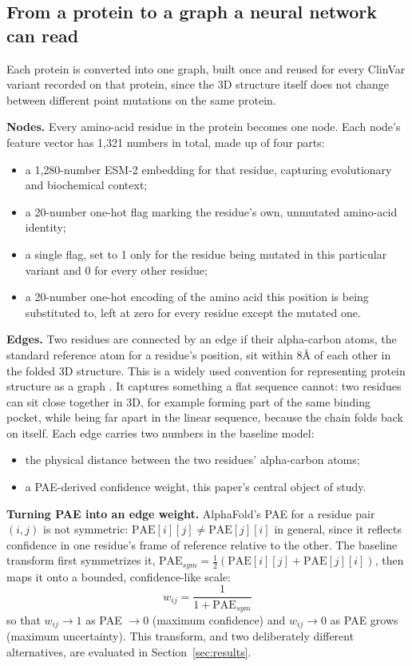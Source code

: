 \documentclass[10pt,conference,a4paper]{IEEEtran}
\begin{document}
\subsection{From a protein to a graph a neural network can read}

Each protein is converted into one graph, built once and reused for every ClinVar variant recorded on that protein, since the 3D structure itself does not change between different point mutations on the same protein.

\textbf{Nodes.} Every amino-acid residue in the protein becomes one node. Each node's feature vector has 1{,}321 numbers in total, made up of four parts:
\begin{itemize}
\item a 1{,}280-number ESM-2 embedding for that residue, capturing evolutionary and biochemical context;
\item a 20-number one-hot flag marking the residue's own, unmutated amino-acid identity;
\item a single flag, set to 1 only for the residue being mutated in this particular variant and 0 for every other residue;
\item a 20-number one-hot encoding of the amino acid this position is being substituted to, left at zero for every residue except the mutated one.
\end{itemize}

\textbf{Edges.} Two residues are connected by an edge if their alpha-carbon atoms, the standard reference atom for a residue's position, sit within 8\r{A} of each other in the folded 3D structure. This is a widely used convention for representing protein structure as a graph \cite{gligorijevic2021deepfri}. It captures something a flat sequence cannot: two residues can sit close together in 3D, for example forming part of the same binding pocket, while being far apart in the linear sequence, because the chain folds back on itself. Each edge carries two numbers in the baseline model:
\begin{itemize}
\item the physical distance between the two residues' alpha-carbon atoms;
\item a PAE-derived confidence weight, this paper's central object of study.
\end{itemize}

\textbf{Turning PAE into an edge weight.} AlphaFold's PAE for a residue pair $(i,j)$ is not symmetric: $\mathrm{PAE}[i][j] \neq \mathrm{PAE}[j][i]$ in general, since it reflects confidence in one residue's frame of reference relative to the other. The baseline transform first symmetrizes it, $\mathrm{PAE}_{sym} = \tfrac{1}{2}(\mathrm{PAE}[i][j]+\mathrm{PAE}[j][i])$, then maps it onto a bounded, confidence-like scale:
\begin{equation}
w_{ij} = \frac{1}{1+\mathrm{PAE}_{sym}}
\end{equation}
so that $w_{ij}\to 1$ as PAE $\to 0$ (maximum confidence) and $w_{ij}\to 0$ as PAE grows (maximum uncertainty). This transform, and two deliberately different alternatives, are evaluated in Section~\ref{sec:results}.
\end{document}
